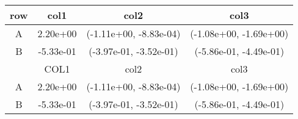 \begin{tabular}{cccc}
\toprule
row&col1&col2&col3\tabularnewline
\midrule
A&2.20e+00& (-1.11e+00, -8.83e-04)& (-1.08e+00, -1.69e+00)\tabularnewline
B&-5.33e-01& (-3.97e-01, -3.52e-01)& (-5.86e-01, -4.49e-01)\tabularnewline
\midrule
&COL1&col2&col3\tabularnewline
\midrule
A&2.20e+00& (-1.11e+00, -8.83e-04)& (-1.08e+00, -1.69e+00)\tabularnewline
B&-5.33e-01& (-3.97e-01, -3.52e-01)& (-5.86e-01, -4.49e-01)\tabularnewline
\bottomrule
\end{tabular}
